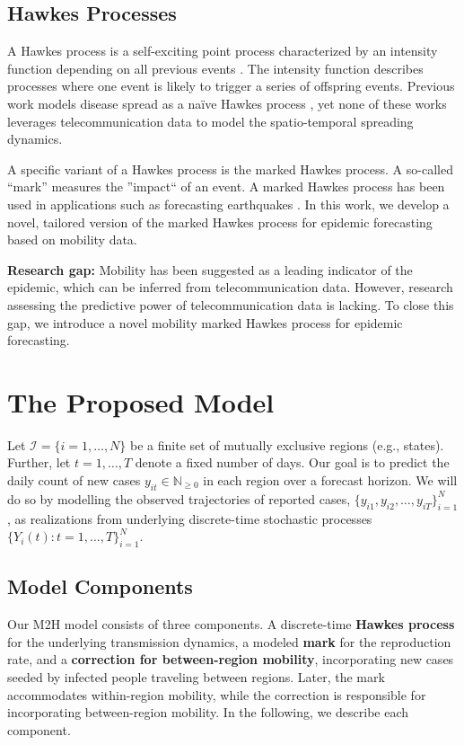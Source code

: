 \documentclass[sigconf, review = false, nonacm = true]{acmart}
\newcommand\model{M2H model\xspace}
\begin{document}
\subsection{Hawkes Processes}

A Hawkes process is a self-exciting point process characterized by an intensity function depending on all previous events \cite{hawkes_cluster_1974}. The intensity function describes processes where one event is likely to trigger a series of offspring events. Previous work models disease spread as a na\"ive Hawkes process \cite{kim_modeling_2019, kelly_real-time_2019, schoenberg_recursive_2019, chiang_hawkes_2020}, yet none of these works leverages telecommunication data to model the spatio-temporal spreading dynamics.

A specific variant of a Hawkes process is the marked Hawkes process. A so-called ``mark'' measures the ''impact`` of an event. A marked Hawkes process has been used in applications such as forecasting earthquakes \cite{ogata_statistical_1988}. In this work, we develop a novel, tailored version of the marked Hawkes process for epidemic forecasting based on mobility data.

\textbf{Research gap:} Mobility has been suggested as a leading indicator of the epidemic, which can be inferred from telecommunication data. However, research assessing the predictive power of telecommunication data is lacking. To close this gap, we introduce a novel mobility marked Hawkes process for epidemic forecasting.

\section{The Proposed Model}

Let $\mathcal I = \{i=1,\ldots,N\}$ be a finite set of mutually exclusive regions (e.g., states). Further, let $t=1,\ldots,T$ denote a fixed number of days. Our goal is to predict the daily count of new cases $y_{it} \in \mathbb N_{\geq 0}$ in each region over a forecast horizon. We will do so by modelling the observed trajectories of reported cases, $\{y_{i1},y_{i2},\ldots,y_{iT}\}^N_{i=1}$, as realizations from underlying discrete-time stochastic processes $\{Y_i(t) \colon t=1,\ldots,T\}^N_{i=1}$.

\subsection{Model Components}

Our \model consists of three components. A discrete-time \textbf{Hawkes process} for the underlying transmission dynamics, a modeled \textbf{mark} for the reproduction rate, and a \textbf{correction for between-region mobility}, incorporating new cases seeded by infected people traveling between regions. Later, the mark accommodates within-region mobility, while the correction is responsible for incorporating between-region mobility. In the following, we describe each component. 
\end{document}
